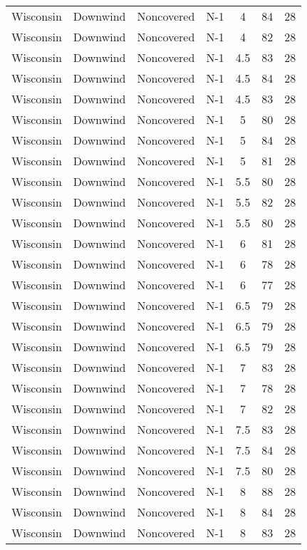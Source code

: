 \documentclass{article}
\begin{document}
\begin{longtable}[H]{ccccccc}
Wisconsin & Downwind & Noncovered & N-1 & 4    & 84  & 28 \\
Wisconsin & Downwind & Noncovered & N-1 & 4    & 82  & 28 \\
Wisconsin & Downwind & Noncovered & N-1 & 4.5  & 83  & 28 \\
Wisconsin & Downwind & Noncovered & N-1 & 4.5  & 84  & 28 \\
Wisconsin & Downwind & Noncovered & N-1 & 4.5  & 83  & 28 \\
Wisconsin & Downwind & Noncovered & N-1 & 5    & 80  & 28 \\
Wisconsin & Downwind & Noncovered & N-1 & 5    & 84  & 28 \\
Wisconsin & Downwind & Noncovered & N-1 & 5    & 81  & 28 \\
Wisconsin & Downwind & Noncovered & N-1 & 5.5  & 80  & 28 \\
Wisconsin & Downwind & Noncovered & N-1 & 5.5  & 82  & 28 \\
Wisconsin & Downwind & Noncovered & N-1 & 5.5  & 80  & 28 \\
Wisconsin & Downwind & Noncovered & N-1 & 6    & 81  & 28 \\
Wisconsin & Downwind & Noncovered & N-1 & 6    & 78  & 28 \\
Wisconsin & Downwind & Noncovered & N-1 & 6    & 77  & 28 \\
Wisconsin & Downwind & Noncovered & N-1 & 6.5  & 79  & 28 \\
Wisconsin & Downwind & Noncovered & N-1 & 6.5  & 79  & 28 \\
Wisconsin & Downwind & Noncovered & N-1 & 6.5  & 79  & 28 \\
Wisconsin & Downwind & Noncovered & N-1 & 7    & 83  & 28 \\
Wisconsin & Downwind & Noncovered & N-1 & 7    & 78  & 28 \\
Wisconsin & Downwind & Noncovered & N-1 & 7    & 82  & 28 \\
Wisconsin & Downwind & Noncovered & N-1 & 7.5  & 83  & 28 \\
Wisconsin & Downwind & Noncovered & N-1 & 7.5  & 84  & 28 \\
Wisconsin & Downwind & Noncovered & N-1 & 7.5  & 80  & 28 \\
Wisconsin & Downwind & Noncovered & N-1 & 8    & 88  & 28 \\
Wisconsin & Downwind & Noncovered & N-1 & 8    & 84  & 28 \\
Wisconsin & Downwind & Noncovered & N-1 & 8    & 83  & 28 \\

\end{longtable}
\end{document}
